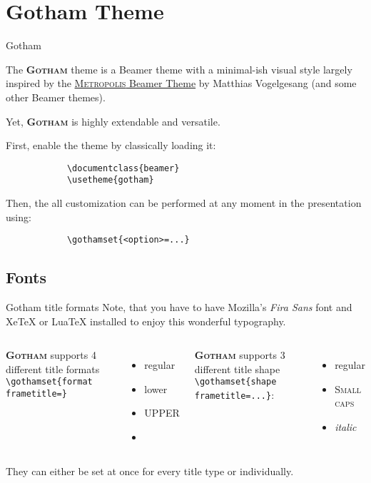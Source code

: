 \documentclass[aspectratio=169]{beamer}
\newcommand{\themename}{\textbf{\textsc{Gotham}}}
\begin{document}
 

\section{Gotham Theme}

	\begin{frame}[fragile]{Gotham}
	
		The \themename{} theme is a Beamer theme with a minimal-ish visual style largely inspired by the \href{https://github.com/matze/mtheme}{\textsc{Metropolis} Beamer Theme} by Matthias Vogelgesang (and some other Beamer themes).

		Yet, \themename{} is highly extendable and versatile.
		\bigskip
		
		First, enable the theme by classically loading it:
		
		\begin{verbatim}
			\documentclass{beamer}
			\usetheme{gotham}
		\end{verbatim}
		
		Then, the all customization can be performed at any moment in the presentation using:

		\begin{verbatim}
			\gothamset{<option>=...}
		\end{verbatim}
	\end{frame}


\subsection{Fonts}

	\begin{frame}[fragile]{Gotham title formats}
		Note, that you have to have Mozilla's \emph{Fira Sans} font and XeTeX or LuaTeX installed to enjoy this wonderful typography.

		\begin{columns}[T,onlytextwidth]
			\themename{} supports 4 different title formats \verb|\gothamset{format frametitle=}|
			\begin{itemize}
				\item regular
				\item \MakeLowercase{Lower}
				\item \MakeUppercase{Upper}
				\item {}
			\end{itemize}
			\themename{} supports 3 different title shape \verb|\gothamset{shape frametitle=...}|:
			\begin{itemize}
				\item regular
				\item \textsc{Small caps}
				\item \textit{italic}
			\end{itemize}
		\end{columns}
		
		\vspace{2em}
		They can either be set at once for every title type or individually.
	\end{frame}
\end{document}
